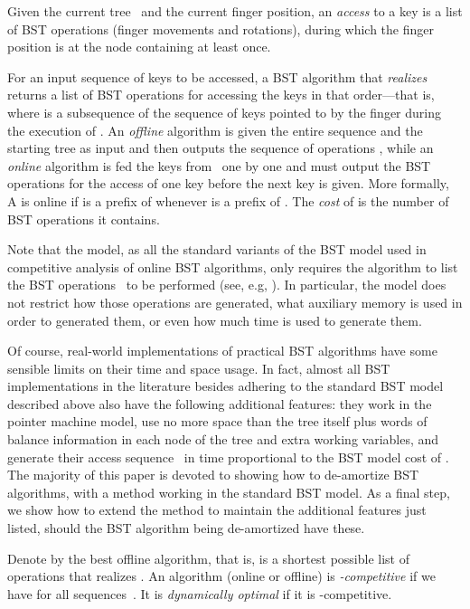 \documentclass[11pt]{article}
\begin{document}
Given the current tree~ and the current finger position, an
\emph{access} to a key  is a list of BST operations (finger movements
and rotations), during which the finger position is at the node containing
 at least once.

For an input sequence  of keys to be accessed, a
BST algorithm  that \emph{realizes}  returns a list  of BST
operations for accessing the keys  in that order---that
is, where  is a subsequence of the sequence of keys pointed to by the
finger during the execution of .  An \emph{offline} algorithm 
is given the entire sequence  and the starting tree  as input and
then outputs the sequence of operations , while an \emph{online}
algorithm is fed the keys from~ one by one and must output the BST
operations for the access of one key before the next key is given. More
formally, A is online if  is a prefix of  whenever  is a
prefix of . The \emph{cost} of  is the number of BST operations
it contains.

Note that the model, as all the standard variants of the BST model used in
competitive analysis of online BST algorithms, only requires the algorithm
to list the BST operations~ to be performed (see, e.g, \cite{wilber89}). In particular, the
model does not restrict how those operations are generated, what auxiliary
memory is used in order to generated them, or even how much time is used to
generate them.

Of course, real-world implementations of practical BST algorithms have some
sensible limits on their time and space usage. In fact, almost all BST
implementations in the literature besides adhering to the standard BST
model described above
also have the following additional features: they work in the pointer
machine model, use no more space than the tree itself plus  words of
balance information in each node of the tree and  extra working
variables, and generate their access sequence~ in time proportional
to the BST model cost of . The majority of this paper is devoted to
showing how to de-amortize BST algorithms, with a method working in the
standard BST model. As a final step, we show how to extend the method to
maintain the additional features just listed, should the BST algorithm
being de-amortized have these.
 
Denote by  the best offline algorithm, that is,  is a
shortest possible list of operations that realizes . An algorithm 
(online or offline) is {\em -competitive} if we have  for all sequences~. It is {\em dynamically
optimal} if it is -competitive.
\end{document}
